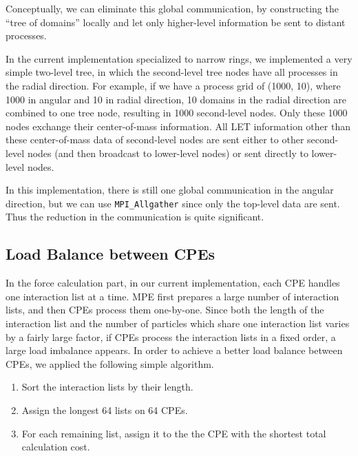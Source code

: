 \documentclass[oribibl]{llncs}
\begin{document}
Conceptually, we can eliminate this global communication, by
constructing the ``tree of domains'' locally and let only higher-level
information be sent to distant processes.

In the current implementation specialized to narrow rings, we
implemented a very simple two-level tree, in which the second-level
tree nodes have all processes in the radial direction. For example, if we
have a process grid of (1000, 10), where 1000 in angular and 10 in
radial direction, 10 domains in the radial direction are combined to
one tree node, resulting in 1000 second-level nodes. Only these 1000
nodes exchange their center-of-mass information. All LET information
other than these center-of-mass data of second-level nodes are sent
either to other second-level nodes (and then broadcast to
lower-level nodes) or sent directly to lower-level nodes.

In this implementation, there is still one global communication in the
angular direction, but we can use {\tt MPI\_Allgather} since only the
top-level data are sent. Thus the reduction in the communication is
quite significant.


\subsection{Load Balance between CPEs}
\label{subsec:force}

In the force calculation part, in our current implementation, each CPE
handles one interaction list at a time. MPE first prepares a large
number of interaction lists, and then CPEs process them
one-by-one. Since both the length of the interaction list and the
number of particles which share one interaction list varies by a
fairly large factor, if CPEs process the interaction lists in a fixed
order, a large load imbalance appears. In order to achieve a better
load balance between CPEs, we applied the following simple algorithm.

\begin{enumerate}
  
\item Sort the interaction lists by their length.

\item Assign the longest 64 lists on 64 CPEs.

\item For each remaining list, assign it to the the CPE with the
  shortest total calculation cost.
  
\end{enumerate}
\end{document}
